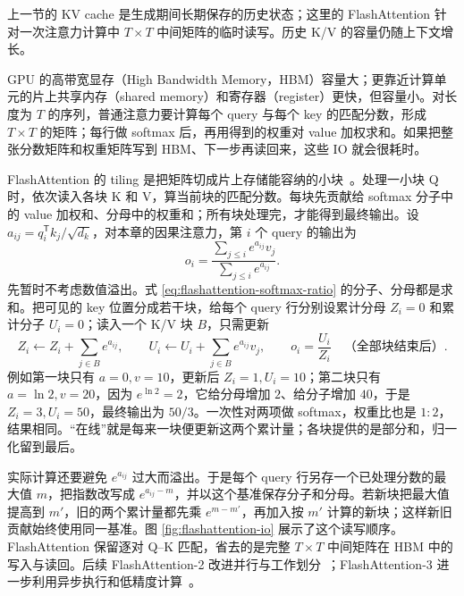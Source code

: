 上一节的 KV cache 是生成期间长期保存的历史状态；这里的 FlashAttention 针对一次注意力计算中 \(T\times T\) 中间矩阵的临时读写。历史 K/V 的容量仍随上下文增长。

GPU 的高带宽显存（High Bandwidth Memory，HBM）容量大；更靠近计算单元的片上共享内存（shared memory）和寄存器（register）更快，但容量小。对长度为 \(T\) 的序列，普通注意力要计算每个 query 与每个 key 的匹配分数，形成 \(T\times T\) 的矩阵；每行做 softmax 后，再用得到的权重对 value 加权求和。如果把整张分数矩阵和权重矩阵写到 HBM、下一步再读回来，这些 IO 就会很耗时。

FlashAttention 的 tiling 是把矩阵切成片上存储能容纳的小块~\cite{dao2022flashattention}。处理一小块 Q 时，依次读入各块 K 和 V，算当前块的匹配分数。每块先贡献给 softmax 分子中的 value 加权和、分母中的权重和；所有块处理完，才能得到最终输出。设 \(a_{ij}=q_i^{\mathsf T}k_j/\sqrt{d_k}\)，对本章的因果注意力，第 \(i\) 个 query 的输出为
\begin{equation}
 o_i=\frac{\sum_{j\le i}e^{a_{ij}}v_j}{\sum_{j\le i}e^{a_{ij}}}.
 \label{eq:flashattention-softmax-ratio}
\end{equation}
先暂时不考虑数值溢出。式 \eqref{eq:flashattention-softmax-ratio} 的分子、分母都是求和。把可见的 key 位置分成若干块，给每个 query 行分别设累计分母 \(Z_i=0\) 和累计分子 \(U_i=0\)；读入一个 K/V 块 \(B\)，只需更新
\begin{equation}
 Z_i\leftarrow Z_i+\sum_{j\in B}e^{a_{ij}},\qquad
 U_i\leftarrow U_i+\sum_{j\in B}e^{a_{ij}}v_j,\qquad
 o_i=\frac{U_i}{Z_i}\quad\text{（全部块结束后）}.
 \label{eq:flashattention-online-softmax}
\end{equation}
例如第一块只有 \(a=0,v=10\)，更新后 \(Z_i=1,U_i=10\)；第二块只有 \(a=\ln 2,v=20\)，因为 \(e^{\ln 2}=2\)，它给分母增加 \(2\)、给分子增加 \(40\)，于是 \(Z_i=3,U_i=50\)，最终输出为 \(50/3\)。一次性对两项做 softmax，权重比也是 \(1:2\)，结果相同。“在线”就是每来一块便更新这两个累计量；各块提供的是部分和，归一化留到最后。

实际计算还要避免 \(e^{a_{ij}}\) 过大而溢出。于是每个 query 行另存一个已处理分数的最大值 \(m\)，把指数改写成 \(e^{a_{ij}-m}\)，并以这个基准保存分子和分母。若新块把最大值提高到 \(m'\)，旧的两个累计量都先乘 \(e^{m-m'}\)，再加入按 \(m'\) 计算的新块；这样新旧贡献始终使用同一基准。图 \ref{fig:flashattention-io} 展示了这个读写顺序。FlashAttention 保留逐对 Q--K 匹配，省去的是完整 \(T\times T\) 中间矩阵在 HBM 中的写入与读回。后续 FlashAttention-2 改进并行与工作划分~\cite{dao2023flashattention2}；FlashAttention-3 进一步利用异步执行和低精度计算~\cite{dao2024flashattention3}。

